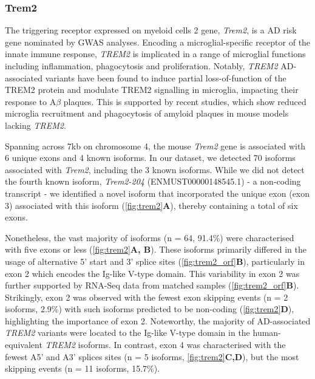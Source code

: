 \newpage
\subsubsection{Trem2}
\label{ch5: trem2_annotation}
The triggering receptor expressed on myeloid cells 2 gene, \textit{Trem2}, is a AD risk gene nominated by GWAS analyses. Encoding a microglial-specific receptor of the innate immune response, \textit{TREM2} is implicated in a range of microglial functions including inflammation, phagocytosis and proliferation. Notably, \textit{TREM2} AD-associated variants have been found to induce partial loss-of-function of the TREM2 protein and modulate TREM2 signalling in microglia, impacting their response to A$\beta$ plaques\cite{Kober2016, Guerreiro2013a}. This is supported by recent studies, which show reduced microglia recruitment and phagocytosis of amyloid plaques in mouse models lacking \textit{TREM2}\cite{Wang2015a}. 

Spanning across 7kb on chromosome 4, the mouse \textit{Trem2} gene is associated with 6 unique exons and 4 known isoforms. In our dataset, we detected 70 isoforms associated with \textit{Trem2}, including the 3 known isoforms. While we did not detect the fourth known isoform, \textit{Trem2-204} (ENMUST00000148545.1) - a non-coding transcript - we identified a novel isoform that incorporated the unique exon (exon 3) associated with this isoform (\cref{fig:trem2}\textbf{A}), thereby containing a total of six exons.   

Nonetheless, the vast majority of isoforms (n = 64, 91.4\%) were characterised with five exons or less (\cref{fig:trem2}\textbf{A, B}). These isoforms primarily differed in the usage of alternative 5' start and 3' splice sites (\cref{fig:trem2_orf}\textbf{B}), particularly in exon 2 which encodes the Ig-like V-type domain. This variability in exon 2 was further supported by RNA-Seq data from matched samples (\cref{fig:trem2_orf}\textbf{B}). Strikingly, exon 2 was observed with the fewest exon skipping events (n = 2 isoforms, 2.9\%) with such isoforms predicted to be non-coding (\cref{fig:trem2}\textbf{D}), highlighting the importance of exon 2. Noteworthy, the majority of AD-associated \textit{TREM2} variants were located to the Ig-like V-type domain in the human-equivalent \textit{TREM2} isoforms. In contrast, exon 4 was characterised with the fewest A5' and A3' splices sites (n = 5 isoforms, \cref{fig:trem2}\textbf{C,D}), but the most skipping events (n = 11 isoforms, 15.7\%). 

